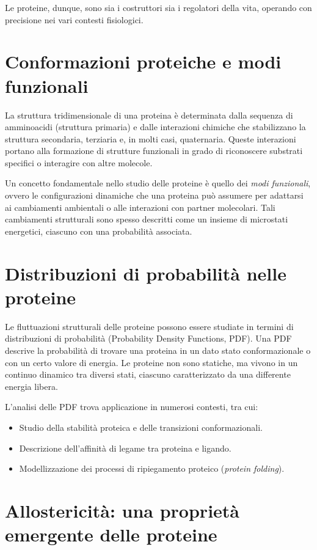 \documentclass[Lau,binding=0.6cm,oneside,noexaminfo]{sapthesis}
\begin{document}
Le proteine, dunque, sono sia i costruttori sia i regolatori della vita, operando con precisione nei vari contesti fisiologici.

\section*{Conformazioni proteiche e modi funzionali}
La struttura tridimensionale di una proteina è determinata dalla sequenza di amminoacidi (struttura primaria) e dalle interazioni chimiche che stabilizzano la struttura secondaria, terziaria e, in molti casi, quaternaria. Queste interazioni portano alla formazione di strutture funzionali in grado di riconoscere substrati specifici o interagire con altre molecole.

Un concetto fondamentale nello studio delle proteine è quello dei \emph{modi funzionali}, ovvero le configurazioni dinamiche che una proteina può assumere per adattarsi ai cambiamenti ambientali o alle interazioni con partner molecolari. Tali cambiamenti strutturali sono spesso descritti come un insieme di microstati energetici, ciascuno con una probabilità associata.

\section*{Distribuzioni di probabilità nelle proteine}
Le fluttuazioni strutturali delle proteine possono essere studiate in termini di distribuzioni di probabilità (Probability Density Functions, PDF). Una PDF descrive la probabilità di trovare una proteina in un dato stato conformazionale o con un certo valore di energia. Le proteine non sono statiche, ma vivono in un continuo dinamico tra diversi stati, ciascuno caratterizzato da una differente energia libera. 

L'analisi delle PDF trova applicazione in numerosi contesti, tra cui:
\begin{itemize}
    \item Studio della stabilità proteica e delle transizioni conformazionali.
    \item Descrizione dell'affinità di legame tra proteina e ligando.
    \item Modellizzazione dei processi di ripiegamento proteico (\emph{protein folding}).
\end{itemize}

\section*{Allostericità: una proprietà emergente delle proteine}
\end{document}
